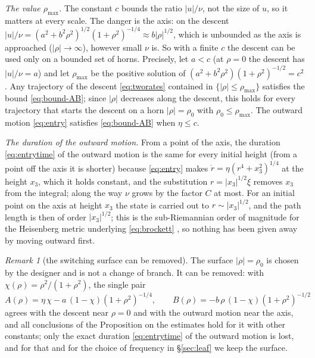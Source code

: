 \documentclass[11pt,reqno]{amsart}
\theoremstyle{plain}
\theoremstyle{definition}
\theoremstyle{remark}
\newtheorem*{remark}{Remark}
\begin{document}
\emph{The value $\rho_{\max}$.} The constant $c$ bounds the ratio $|u|/\nu$, not the size of $u$,
so it matters at every scale. The danger is the axis: on the descent
$|u|/\nu=(a^{2}+b^{2}\rho^{2})^{1/2}(1+\rho^{2})^{-1/4}\approx b|\rho|^{1/2}$, which is unbounded as the
axis is approached ($|\rho|\to\infty$), however small $\nu$ is. So with a finite $c$ the descent can be
used only on a bounded set of horns. Precisely, let $a<c$ (at $\rho=0$ the descent has
$|u|/\nu=a$) and let $\rho_{\max}$ be the positive solution of
$(a^{2}+b^{2}\rho^{2})(1+\rho^{2})^{-1/2}=c^{2}$. Any trajectory of the descent \eqref{eq:tworates}
contained in $\{|\rho|\le\rho_{\max}\}$ satisfies the bound \eqref{eq:bound-AB}; since $|\rho|$ decreases
along the descent, this holds for every trajectory that starts the descent on a horn $|\rho|=\rho_0$ with
$\rho_0\le\rho_{\max}$. The outward motion \eqref{eq:entry} satisfies \eqref{eq:bound-AB} when $\eta\le c$.

\emph{The duration of the outward motion.} From a point of the axis, the duration \eqref{eq:entrytime} of the outward motion is the same for every initial height (from a point off the axis it is shorter) because
\eqref{eq:entry} makes $\dot r=\eta(r^{4}+x_3^{2})^{1/4}$ at the height $x_3$, which it
holds constant, and the substitution $r=|x_3|^{1/2}\xi$ removes $x_3$ from the integral;
along the way $\nu$ grows
by the factor $C$ at most. For an initial point on the axis at height $x_3$ the state is
carried out to $r\sim|x_3|^{1/2}$, and the path length is then of order $|x_3|^{1/2}$;
this is the sub-Riemannian order of magnitude for the Heisenberg metric underlying
\eqref{eq:brockett} \cite{AgrachevBarilariBoscain2019}, so nothing has been given away by moving outward
first.

\begin{remark}[the switching surface can be removed]\label{sec:forced}
The surface $|\rho|=\rho_0$ is chosen by the designer and is not a change of branch. It can be removed:
with $\chi(\rho)=\rho^{2}/(1+\rho^{2})$, the single pair
\begin{equation}\label{eq:smoothAB}
  A(\rho)=\eta\,\chi-a\,(1-\chi)(1+\rho^{2})^{-1/4},\qquad
  B(\rho)=-b\,\rho\,(1-\chi)(1+\rho^{2})^{-1/2}
\end{equation}
agrees with the descent near $\rho=0$ and with the outward motion near the axis, and all conclusions of
the Proposition on the estimates hold for it with other constants; only the exact duration
\eqref{eq:entrytime} of the outward motion is lost, and for that and for the choice of frequency in \S\ref{sec:leaf} we keep the surface.
\end{remark}
\end{document}
